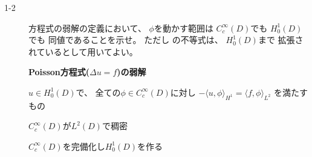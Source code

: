 \documentclass[12pt,b5paper]{ltjsarticle}
\begin{document}
\begin{description}
            \hrulefill

 \item[1-2]
             方程式の弱解の定義において、
            $\phi$を動かす範囲は
            $C_{c}^{\infty}(D)$でも
            $H_{0}^{1}(D)$でも
            同値であることを示せ。
            ただし  の不等式は、
            $H_{0}^{1}(D)$まで
            拡張されているとして用いてよい。


            \textbf{Poisson方程式($\Delta u = f$)の弱解}
            
            $u\in H_{0}^{1}(D)$で、
            全ての$\phi \in C_{c}^{\infty}(D)$に対し
            $-\langle u,\phi \rangle _{H^{1}}=\langle f,\phi \rangle_{L^{2}}$
            を満たすもの

            \dotfill

            $C_{c}^{\infty}(D)$が$L^{2}(D)$で稠密

            $C_{c}^{\infty}(D)$を完備化し$H_{0}^{1}(D)$を作る

            
            \hrulefill



\end{description}

\hrulefill
\end{document}
